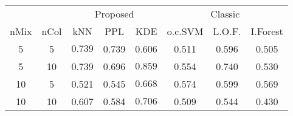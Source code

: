 
\begin{tabular}{cccccccc}
\toprule
\multicolumn{2}{c}{ } & \multicolumn{3}{c}{Proposed} & \multicolumn{3}{c}{Classic} \\
\cmidrule(l{3pt}r{3pt}){3-5} \cmidrule(l{3pt}r{3pt}){6-8}
nMix & nCol & kNN & PPL & KDE & o.c.SVM & L.O.F. & I.Forest\\
\midrule
5 & 5 & $\bm{0.739}$ & 0.739 & 0.606 & 0.511 & 0.596 & 0.505\\
5 & 10 & 0.739 & 0.696 & $\bm{0.859}$ & 0.554 & 0.740 & 0.530\\
10 & 5 & 0.521 & 0.545 & $\bm{0.668}$ & 0.574 & 0.599 & 0.569\\
10 & 10 & 0.607 & 0.584 & $\bm{0.706}$ & 0.509 & 0.544 & 0.430\\
\bottomrule
\end{tabular}